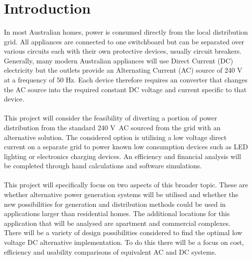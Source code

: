 
\section{Introduction}

\paragraph{} 
In most Australian homes, power is consumed directly from the local distribution grid. All appliances are connected to one switchboard but can be separated over various circuits each with their own protective devices, usually circuit breakers. Generally, many modern Australian appliances will use Direct Current (DC) electricity but the outlets provide an Alternating Current (AC) source of 240 \si{V} at a frequency of 50 \si{Hz}. Each device therefore requires an converter that changes the AC source into the required constant DC voltage and current specific to that device. 

\paragraph{} 
This project will consider the feasibility of diverting a portion of power distribution from the standard 240 \si{V AC} sourced from the grid with an alternative solution. The considered option is utilising a low voltage direct current on a separate grid to power known low consumption devices such as LED lighting or electronics charging devices. An efficiency and financial analysis will be completed through hand calculations and software simulations.  

\paragraph{} 
This project will specifically focus on two aspects of this broader topic. These are whether alternative power generation systems will be utilised and whether the new possibilities for generation and distribution methods could be used in applications larger than residential homes. The additional locations for this application that will be analysed are apartment and commercial complexes. There will be a variety of design possibilities considered to find the optimal low voltage DC alternative implementation. To do this there will be a focus on cost, efficiency and usability comparisons of equivalent AC and DC systems.   

\newpage